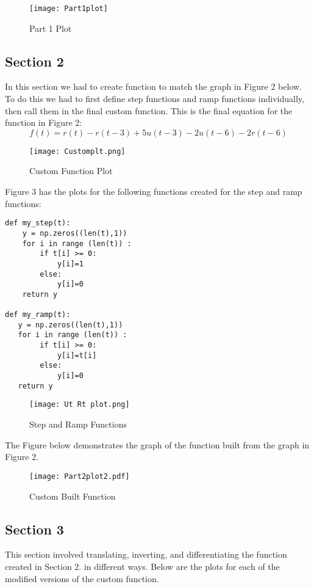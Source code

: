 \documentclass{article}
\begin{document}
\begin{figure}[h]
\centering
\texttt{[image: Part1plot]}
\caption{Part 1 Plot}
\label{fig:Part1plot}
\end{figure}

\newpage

\subsection*{Section 2}
In this section we had to create function to match the graph in Figure 2 below. To do this we had to first define step functions and ramp functions individually, then call them in the final custom function.
This is the final equation for the function in Figure 2: $$f(t)=r(t)-r(t-3)+5u(t-3)-2u(t-6)-2r(t-6)$$

\begin{figure}[h!]
\centering
\texttt{[image: Customplt.png]}
\caption{Custom Function Plot}
\label{fig:Part1plot}
\end{figure}

Figure 3 has the plots for the following functions created for the step and ramp functions:

\begin{verbatim}
def my_step(t):
    y = np.zeros((len(t),1))
    for i in range (len(t)) :
        if t[i] >= 0: 
            y[i]=1
        else: 
            y[i]=0
    return y

def my_ramp(t):
   y = np.zeros((len(t),1))    
   for i in range (len(t)) :
        if t[i] >= 0: 
            y[i]=t[i]
        else: 
            y[i]=0
   return y
\end{verbatim} 

\begin{figure}[h]
\centering
\texttt{[image: Ut Rt plot.png]}
\caption{Step and Ramp Functions}
\label{fig:Step and Ramp Functions}
\end{figure}

The Figure below demonstrates the graph of the function built from the graph in Figure 2.
\begin{figure}[h]
\centering
\texttt{[image: Part2plot2.pdf]}
\caption{Custom Built Function}
\label{fig:Step and Ramp Functions}
\end{figure}

\newpage

\subsection*{Section 3}
This section involved translating, inverting, and differentiating the function created in Section 2. in different ways. Below are the plots for each of the modified versions of the custom function.
\end{document}
